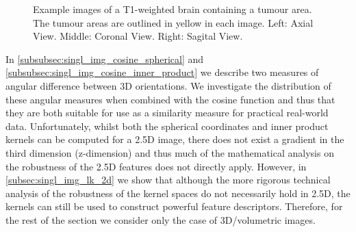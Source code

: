 \begin{figure}
\begin{subfigure}{0.32\columnwidth}
    \end{subfigure}
    \caption{Example images of a T1-weighted brain containing a tumour area.
             The tumour areas are outlined in yellow in each image.
             Left: Axial View. Middle: Coronal View. Right: Sagital View.}
\label{fig:singl_img_tumour_examples}
\end{figure}

In \cref{subsubsec:singl_img_cosine_spherical} and
\cref{subsubsec:singl_img_cosine_inner_product} we describe two measures of angular
difference between 3D orientations. We investigate the distribution of these
angular measures when combined with the cosine function and thus that they
are both suitable for use as a similarity measure for practical real-world data.
Unfortunately, whilst both the spherical coordinates and inner product kernels
can be computed for a 2.5D image,
there does not exist a gradient in the third dimension (z-dimension) and thus
much of the mathematical analysis on the robustness of the 2.5D features does
not directly apply. However, in
\cref{subsec:singl_img_lk_2d} we show that although the more rigorous technical
analysis of the robustness of the kernel spaces do not necessarily
hold in 2.5D, the kernels can still be used to construct
powerful feature descriptors. Therefore, for the rest of the section we consider
only the case of 3D/volumetric images.
